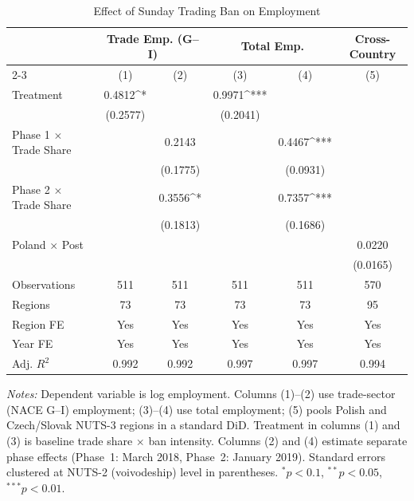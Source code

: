 \begin{table}[htbp]
\centering
\caption{Effect of Sunday Trading Ban on Employment}
\label{tab:main}
\begin{tabular}{lccccc}
\hline\hline
 & \multicolumn{2}{c}{Trade Emp. (G--I)} & \multicolumn{2}{c}{Total Emp.} & Cross-Country \\
\cline{2-3} \cline{4-5} \cline{6-6}
 & (1) & (2) & (3) & (4) & (5) \\
\hline
Treatment & 0.4812^{*} & & 0.9971^{***} & & \\
 & (0.2577) & & (0.2041) & & \\
Phase 1 $\times$ Trade Share & & 0.2143 & & 0.4467^{***} & \\
 & & (0.1775) & & (0.0931) & \\
Phase 2 $\times$ Trade Share & & 0.3556^{*} & & 0.7357^{***} & \\
 & & (0.1813) & & (0.1686) & \\
Poland $\times$ Post & & & & & 0.0220 \\
 & & & & & (0.0165) \\
\hline
Observations & 511 & 511 & 511 & 511 & 570 \\
Regions & 73 & 73 & 73 & 73 & 95 \\
Region FE & Yes & Yes & Yes & Yes & Yes \\
Year FE & Yes & Yes & Yes & Yes & Yes \\
Adj. $R^2$ & 0.992 & 0.992 & 0.997 & 0.997 & 0.994 \\
\hline\hline
\end{tabular}
\begin{tablenotes}[flushleft]
\small
\item \textit{Notes:} Dependent variable is log employment. Columns (1)--(2) use trade-sector (NACE G--I) employment; (3)--(4) use total employment; (5) pools Polish and Czech/Slovak NUTS-3 regions in a standard DiD. Treatment in columns (1) and (3) is baseline trade share $\times$ ban intensity. Columns (2) and (4) estimate separate phase effects (Phase~1: March 2018, Phase~2: January 2019). Standard errors clustered at NUTS-2 (voivodeship) level in parentheses. $^{*}p<0.1$, $^{**}p<0.05$, $^{***}p<0.01$.
\end{tablenotes}
\end{table}

